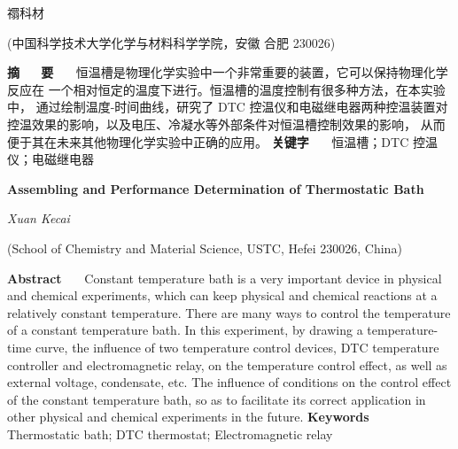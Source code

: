 \documentclass[12pt]{ctexart}
\numberwithin{equation}{section}
\begin{document}
\nocite{*}

\begin{center}
    \heiti {}

    \vspace{12pt}

    \kaishu \fontsize{13.75pt}{0}禤科材
    


    \vspace{5pt}

    \songti \fontsize{12pt}{0}(中国科学技术大学化学与材料科学学院，安徽 合肥 230026)
\end{center}

\noindent\textbf{摘~~~\!要}~~~\!
恒温槽是物理化学实验中一个非常重要的装置，它可以保持物理化学反应在
一个相对恒定的温度下进行。恒温槽的温度控制有很多种方法，在本实验中，
通过绘制温度-时间曲线，研究了 DTC 控温仪和电磁继电器两种控温装置对
控温效果的影响，以及电压、冷凝水等外部条件对恒温槽控制效果的影响，
从而便于其在未来其他物理化学实验中正确的应用。
\newline
\textbf{关键字}~~~\!
恒温槽；DTC 控温仪；电磁继电器

\begin{center}
    {\LARGE\rmfamily\textbf{Assembling and Performance Determination of Thermostatic Bath}}

    \vspace{12pt}

    {\slshape Xuan Kecai}

    \vspace{5pt}

    (School of Chemistry and Material Science, USTC, Hefei 230026, China)
\end{center}

\noindent\textbf{Abstract}~~~\!
Constant temperature bath is a very important device in
physical and chemical experiments, which can keep physical
and chemical reactions at a relatively constant temperature.
There are many ways to control the temperature of a constant
temperature bath. In this experiment, by drawing a
temperature-time curve, the influence of two temperature
control devices, DTC temperature controller and
electromagnetic relay, on the temperature control effect, as
well as external voltage, condensate, etc. The influence of
conditions on the control effect of the constant temperature
bath, so as to facilitate its correct application in other
physical and chemical experiments in the future.
\newline
\textbf{Keywords}~~~\!
Thermostatic bath; DTC thermostat; Electromagnetic relay
\end{document}
